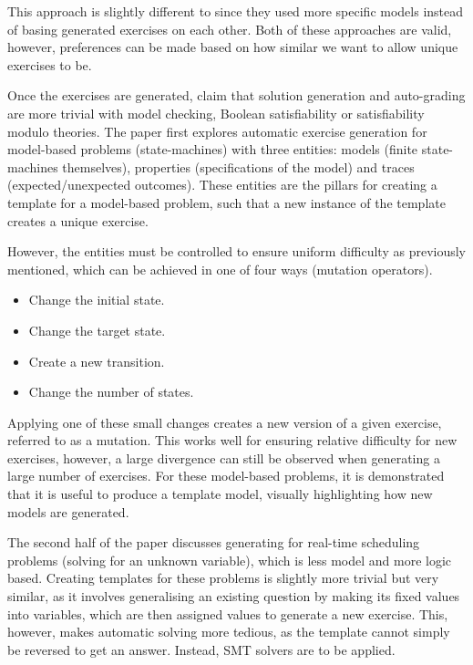 \documentclass{l4proj}
\begin{document}
This approach is slightly different to \citet{Hoz21} since they used more specific models instead of basing generated exercises on each other. Both of these approaches are valid, however, preferences can be made based on how similar we want to allow unique exercises to be. 

Once the exercises are generated, \citet{Sad12} claim that solution generation and auto-grading are more trivial with model checking, Boolean satisfiability or satisfiability modulo theories. The paper first explores automatic exercise generation for model-based problems (state-machines) with three entities: models (finite state-machines themselves), properties (specifications of the model) and traces (expected/unexpected outcomes). These entities are the pillars for creating a template for a model-based problem, such that a new instance of the template creates a unique exercise. 

However, the entities must be controlled to ensure uniform difficulty as previously mentioned, which can be achieved in one of four ways (mutation operators). 

\begin{itemize}
	\item
	Change the initial state.
	\item
	Change the target state.
	\item
	 Create a new transition.
	\item
	 Change the number of states.
\end{itemize}

Applying one of these small changes creates a new version of a given exercise, referred to as a mutation. This works well for ensuring relative difficulty for new exercises, however, a large divergence can still be observed when generating a large number of exercises. For these model-based problems, it is demonstrated that it is useful to produce a template model, visually highlighting how new models are generated. 

The second half of the paper discusses generating for real-time scheduling problems (solving for an unknown variable), which is less model and more logic based. Creating templates for these problems is slightly more trivial but very similar, as it involves generalising an existing question by making its fixed values into variables, which are then assigned values to generate a new exercise. This, however, makes automatic solving more tedious, as the template cannot simply be reversed to get an answer. Instead, SMT solvers are to be applied.
 
\end{document}
